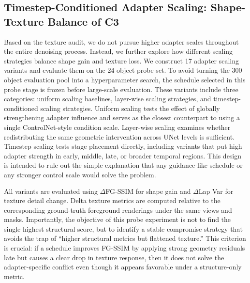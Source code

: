 \documentclass[times,twocolumn,final]{elsarticle}
\providecommand{\DIFadd}[1]{{\protect\color{blue} \sf #1}} %
\providecommand{\DIFaddbegin}{} %
\providecommand{\DIFaddend}{} %
\newcommand{\DIFaddincludegraphics}[2][]{{\color{blue}\fbox{\DIFOincludegraphics[#1]{#2}}}} %
\DeclareRobustCommand{\DIFaddbegin}{\DIFOaddbegin \let\includegraphics\DIFaddincludegraphics} %
\DeclareRobustCommand{\DIFaddend}{\DIFOaddend \let\includegraphics\DIFOincludegraphics} %
\begin{document}
\subsection{Timestep-Conditioned Adapter Scaling: Shape-Texture Balance of C3}
\label{subsec:c3}

Based on the texture audit, we do not pursue higher adapter scales throughout the entire denoising process. Instead, we further explore how different scaling strategies balance shape gain and texture loss. We construct 17 adapter scaling variants and evaluate them on the 24-object probe set. To avoid turning the 300-object   \DIFaddbegin \DIFadd{evaluation pool }\DIFaddend into a hyperparameter search, the schedule selected in this probe stage is frozen before large-scale evaluation. These variants include three categories: uniform scaling baselines, layer-wise scaling strategies, and timestep-conditioned scaling strategies. Uniform scaling tests the effect of globally strengthening adapter influence and serves as the closest counterpart to using a single ControlNet-style condition scale. Layer-wise scaling examines whether redistributing the same geometric intervention across UNet levels is sufficient. Timestep scaling tests stage placement directly, including variants that put high adapter strength in early, middle, late, or broader temporal regions. This design is intended to rule out the simple explanation that any guidance-like schedule or any stronger control scale would solve the problem.

All variants are evaluated using $\Delta$FG-SSIM for shape gain and $\Delta$Lap Var for texture detail change. Delta texture metrics are computed relative to the corresponding ground-truth foreground renderings under the same views and masks. Importantly, the objective of this probe experiment is not to find the single highest structural score, but to identify a stable compromise strategy that avoids the trap of ``higher structural metrics but flattened texture.'' This criterion is crucial: if a schedule improves FG-SSIM by applying strong geometry residuals late but causes a clear drop in texture response, then it does not solve the adapter-specific conflict even though it appears favorable under a structure-only metric.
\end{document}
